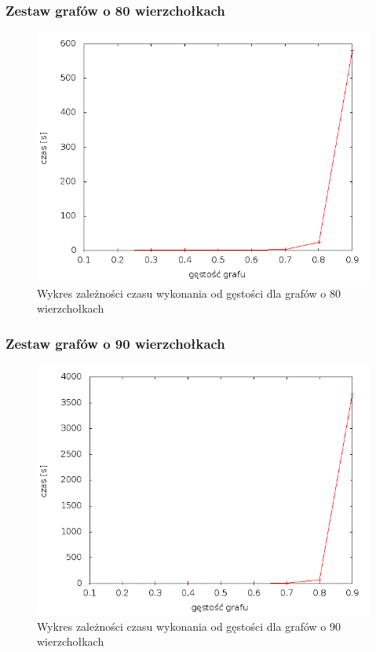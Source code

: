 \documentclass[12pt, a4paper]{article}
\begin{document}
\subsubsection*{Zestaw grafów o 80 wierzchołkach}
\begin{figure}[!h]
    \begin{center}
	\includegraphics[scale=0.5]{results/img/dim/dim_80.png}
	\caption{Wykres zależności czasu wykonania od gęstości dla grafów o 80 wierzchołkach}
    \end{center}
\end{figure}
\FloatBarrier
\newpage
\subsubsection*{Zestaw grafów o 90 wierzchołkach}
\begin{figure}[!h]
    \begin{center}
	\includegraphics[scale=0.5]{results/img/dim/dim_90.png}
	\caption{Wykres zależności czasu wykonania od gęstości dla grafów o 90 wierzchołkach}
    \end{center}
\end{figure}
\FloatBarrier
\end{document}
